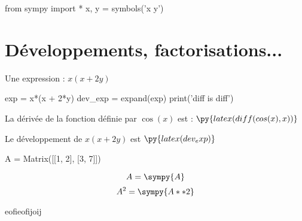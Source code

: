 \documentclass[12pt,a4paper]{article}
\begin{document}
\begin{pycode}
from sympy import *
x, y = symbols('x y')
\end{pycode}



\section{Développements, factorisations...}
Une expression : $x(x + 2y)$
\begin{pycode}
exp = x*(x + 2*y)
dev_exp = expand(exp)
print('diff is diff')
\end{pycode}


La dérivée de la fonction définie par $\cos(x)$ est : $\py{latex(diff(cos(x), x))}$

Le développement de $x(x + 2y)$ est $\py{latex(dev_exp)}$



\begin{sympycode}
A = Matrix([[1, 2], [3, 7]])
\end{sympycode}
%
\begin{equation}
 A 
 =
\sympy{A}
\end{equation}
%
%
\begin{equation*}
 A^2 
 =
\sympy{A**2}
\end{equation*}

eofieofijoij
\end{document}
